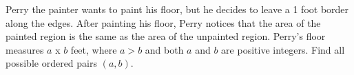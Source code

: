 Perry the painter wants to paint his floor, but he decides to leave a 1 foot border along the edges. After painting his floor, Perry notices that the area of the painted region is the same as the area of the unpainted region. Perry's floor measures $a$ x $b$ feet, where $a>b$ and both $a$ and $b$ are positive integers. Find all possible ordered pairs $(a, b)$.